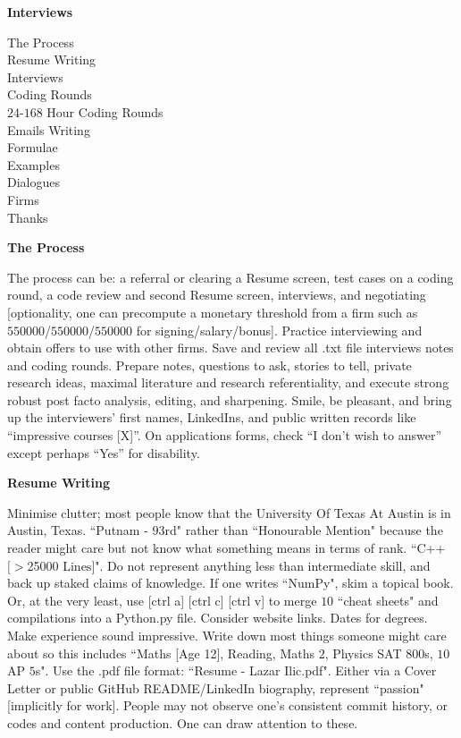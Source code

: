 \huge
\textbf{Interviews}
\Large

The Process \\
Resume Writing \\
Interviews \\
Coding Rounds \\
$24$-$168$ Hour Coding Rounds \\
Emails Writing \\
Formulae \\
Examples \\
Dialogues \\
Firms \\
Thanks

\textbf{The Process}

The process can be: a referral or clearing a Resume screen, test cases on a coding round, a code review and second Resume screen, interviews, and negotiating [optionality, one can precompute a monetary threshold from a firm such as $550000$/$550000$/$550000$ for signing/salary/bonus]. Practice interviewing and obtain offers to use with other firms. Save and review all .txt file interviews notes and coding rounds. Prepare notes, questions to ask, stories to tell, private research ideas, maximal literature and research referentiality, and execute strong robust post facto analysis, editing, and sharpening. Smile, be pleasant, and bring up the interviewers' first names, LinkedIns, and public written records like ``impressive courses [X]''. On applications forms, check ``I don't wish to answer'' except perhaps ``Yes'' for disability.

\textbf{Resume Writing}

Minimise clutter; most people know that the University Of Texas At Austin is in Austin, Texas. ``Putnam - $93$rd" rather than ``Honourable Mention" because the reader might care but not know what something means in terms of rank. ``C++ $[>$25000$ \text{ Lines}]$". Do not represent anything less than intermediate skill, and back up staked claims of knowledge. If one writes ``NumPy", skim a topical book. Or, at the very least, use [ctrl a] [ctrl c] [ctrl v] to merge $10$ ``cheat sheets" and compilations into a Python.py file. Consider website links. Dates for degrees. Make experience sound impressive. Write down most things someone might care about so this includes ``Maths [Age 12], Reading, Maths $2$, Physics SAT $800$s, $10$ AP $5$s". Use the .pdf file format: ``Resume - Lazar Ilic.pdf". Either via a Cover Letter or public GitHub README/LinkedIn biography, represent ``passion" [implicitly for work]. People may not observe one's consistent commit history, or codes and content production. One can draw attention to these.

